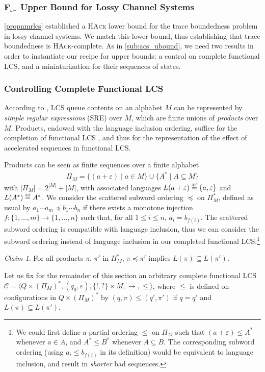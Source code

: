 \documentclass[11pt,reqno,a4paper]{amsart}
\newcommand{\eqdef}{\stackrel{\raisebox{-.15ex}{\scalebox{.5}{\upshape\textrm{def}}}}{=}}
\newcommand{\tup}[1]{\langle #1\rangle}
\newcommand{\subword}{\preceq}
\theoremstyle{plain}
\theoremstyle{definition}
\theoremstyle{remark}
\newtheorem{claim}{Claim}[theorem]
\renewcommand{\paragraph}{\subsubsection*}
\begin{document}
\subsubsection{$\mathbf{F}_{\omega^\omega}$ Upper Bound for Lossy Channel Systems}\label{sub:lcs_ubound}
\autoref{propnmrlcs} established a \textsc{HAck} lower
bound for the trace boundedness problem in lossy channel systems.  We match
this lower bound, thus establishing that trace boundedness is
\textsc{HAck}-complete.  As in \autoref{sub:acs_ubound}, we need
two results in order to instantiate our recipe for upper bounds: a
control on complete functional LCS, and a miniaturization for their
sequences of states.

\paragraph{Controlling Complete Functional LCS}
According to \citet{fwlcs}, LCS queue contents on an alphabet $M$
can be represented by \emph{simple regular expressions} (SRE) over
$M$, which are finite unions of \emph{products} over $M$.  Products, endowed with the language
inclusion ordering, suffice for the completion of functional LCS
\citep[Section~5]{cwsts1}, and thus for the representation of the
effect of accelerated sequences in functional LCS.

\setcounter{claim}{0}
\addtocounter{theorem}{2}
Products can be seen as finite sequences over a finite alphabet 
\begin{align*}
  \Pi_M=\{(a+\varepsilon)\mid a\in M\}\cup\{A^\ast\mid
  A\subseteq M\}
\end{align*}
with $|\Pi_M|=2^{|M|}+|M|$, with associated languages
$L(a+\varepsilon)\eqdef\{a,\varepsilon\}$ and $L(A^\ast)\eqdef
A^\ast$.  We consider the scattered subword ordering $\subword$ on
$\Pi_M^\ast$, defined as usual by $a_1\cdots a_m\subword b_1\cdots
b_n$ if there exists a monotone injection
$f:\{1,\dots,m\}\rightarrow\{1,\dots,n\}$ such that, for all $1\leq
i\leq n$, $a_i=b_{f(i)}$.  The scattered subword ordering is
compatible with language inclusion, thus we can consider the subword
ordering instead of language inclusion in our completed functional
LCS:\footnote{We could first define a partial ordering $\leq$ on
  $\Pi_M$ such that $(a+\varepsilon)\leq A^\ast$ whenever $a\in A$,
  and $A^\ast\leq B^\ast$ whenever $A\subseteq B$.  The corresponding
  subword ordering (using $a_i\leq b_{f(i)}$ in its definition) would
  be equivalent to language inclusion, and result in \emph{shorter}
  bad sequences.}
\begin{claim}\label{cl:subprod}
  For all products $\pi$, $\pi'$ in $\Pi_M^\ast$, $\pi\subword\pi'$
  implies $L(\pi)\subseteq L(\pi')$.
\end{claim}
Let us fix for the remainder of this section an arbitrary complete
functional LCS $\mathcal{C}=\tup{Q\times
  (\Pi_M)^\ast,(q_0,\varepsilon),\{!,?\}\times
  M,{\rightarrow},{\leq}}$, where $\leq$ is defined on
configurations in $Q\times(\Pi_M)^\ast$ by $(q,\pi)\leq(q',\pi')$ if $q=q'$
and $L(\pi)\subseteq L(\pi')$.
\end{document}
